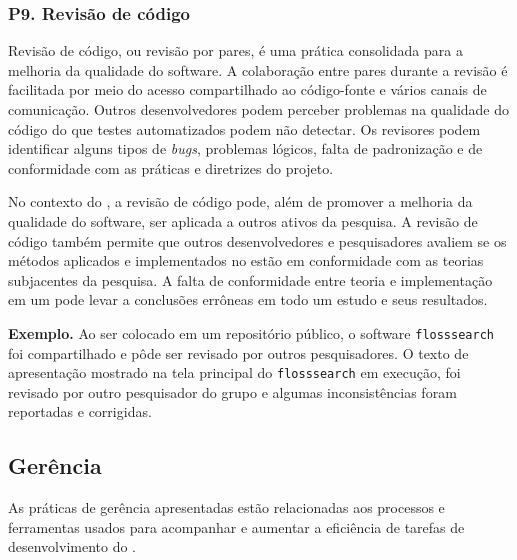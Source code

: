 \subsubsection*{P9. Revisão de código} 

Revisão de código, ou revisão por pares, é uma prática consolidada para a melhoria da qualidade do software.
A colaboração entre pares durante a revisão é facilitada por meio do acesso compartilhado ao código-fonte e vários canais de comunicação. 
Outros desenvolvedores podem perceber problemas na qualidade do  código do \RSw que testes automatizados podem não detectar. 
Os revisores podem identificar alguns tipos de \textit{bugs}, problemas lógicos, falta de padronização e de conformidade com as práticas e diretrizes do projeto.

No contexto do \RS, a revisão de código pode, além de promover a melhoria da qualidade do software, ser aplicada a outros ativos da pesquisa. 
%
A revisão de código também permite que outros desenvolvedores e pesquisadores avaliem se os métodos aplicados e implementados no \RSw estão em conformidade com as teorias subjacentes da pesquisa. A falta de conformidade entre teoria e implementação em um \RSw  pode levar a conclusões errôneas em todo um estudo e seus resultados.


\noindent \textbf{Exemplo.}
Ao ser colocado em um repositório público, o software 
\texttt{flosssearch} foi compartilhado e pôde ser revisado por outros pesquisadores.
O texto de apresentação mostrado na tela principal do \texttt{flosssearch} em execução, foi revisado por outro pesquisador do grupo e algumas inconsistências foram reportadas e corrigidas.


\subsection{Gerência}

As práticas de gerência apresentadas estão relacionadas aos processos e ferramentas usados para acompanhar e aumentar a eficiência de tarefas de desenvolvimento do \RS. 

